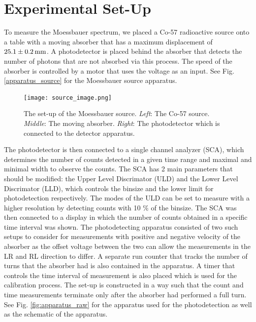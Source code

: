 \documentclass[a4paper]{report}
\numberwithin{equation}{section}
\begin{document}
\chapter{Experimental Set-Up}

To measure the Moessbauer spectrum, we placed a Co-57 radioactive source onto a table with a moving absorber 
that has a maximum displacement of $\SI[]{25.1 \pm 0.2}[]{\milli\metre}$.  A photodetector is placed 
behind the absorber that detects the number of photons that are not absorbed via this process. The speed of the 
absorber is controlled by a motor that uses the voltage as an input. See Fig. \ref{apparatus_source}
for the Moessbauer source apparatus. \par 

\begin{figure}[htb!]
	\centering
	\texttt{[image: source\_image.png]}

	\caption{The set-up of the Moessbauer source. \textit{Left}: The Co-57 source. \textit{Middle}: 
	The moving absorber. \textit{Right}: The photodetector which is connected to the detector apparatus.
	}
	\label{fig:apparatus_source}
\end{figure}

The photodetector is then connected to a single channel analyzer (SCA), which determines the number of counts detected
in a given time range and maximal and minimal width to observe the counts. The SCA has 2 main parameters that should be modified:
the Upper Level Discrimator (ULD) and the Lower Level Discrimator (LLD), which controls the binsize and the lower limit for 
photodetection respectively. The modes of the ULD can be set to measure with a higher resolution by detecting counts with 
10 $\%$ of the binsize. The SCA was then connected to a display in which the number of counts obtained in a specific time 
interval was shown. 
The photodetecting apparatus consisted of two such setups to consider for measurements with positive and negative velocity 
of the absorber as the offset voltage between the two can allow the measurements in the LR and RL direction to differ.
A separate run counter that tracks the number of turns that the absorber had is also contained in the apparatus. A timer 
that controls the time interval of measurement is also placed which is used for the calibration process. The set-up is 
constructed in a way such that the count and time measurements terminate only after the absorber had performed a full turn. 
See Fig. \ref{fig:apparatus_raw} for the apparatus used for the photodetection as well as the schematic of the apparatus. \par 
\end{document}
